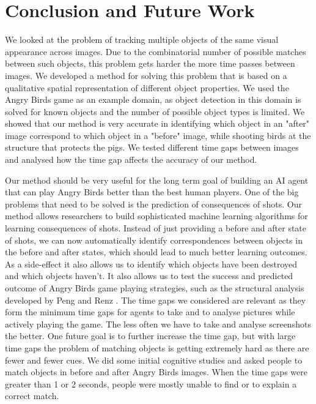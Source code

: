 \documentclass[letterpaper]{article}
\begin{document}
\section{Conclusion and Future Work}

We looked at the problem of tracking multiple objects of the same visual appearance across images. Due to the combinatorial number of possible matches between such objects, this problem gets harder the more time passes between images. We developed a method for solving this problem that is based on a qualitative spatial representation of different object properties. We used the Angry Birds game as an example domain, as object detection in this domain is solved for known objects and the number of possible object types is limited. We showed that our method is very accurate in identifying which object in an "after" image correspond to which object in a "before" image, while shooting birds at the structure that protects the pigs. We tested different time gaps between images and analysed how the time gap affects the accuracy of our method. 

Our method should be very useful for the long term goal of building an AI agent that can play Angry Birds better than the best human players. One of the big problems that need to be solved is the prediction of consequences of shots. Our method allows researchers to build sophisticated machine learning algorithms for learning consequences of shots. Instead of just providing a before and after state of shots, we can now automatically identify correspondences between objects in the before and after states, which should lead to much better learning outcomes. As a side-effect it also allows us to identify which objects have been destroyed and which objects haven't. 
It also allows us to test the success and predicted outcome of Angry Birds game playing strategies, such as the structural analysis developed by Peng and Renz \cite{peng13}. 
The time gaps we considered are relevant as they form the minimum time gaps for agents to take and to analyse pictures while actively playing the game. The less often we have to take and analyse screenshots the better. One future goal is to further increase the time gap, but with large time gaps the problem of matching objects is getting extremely hard as there are fewer and fewer cues. We did some initial cognitive studies and asked people to match objects in before and after Angry Birds images. When the time gaps were greater than 1 or 2 seconds, people were mostly unable to find or to explain a correct match. 
\end{document}
